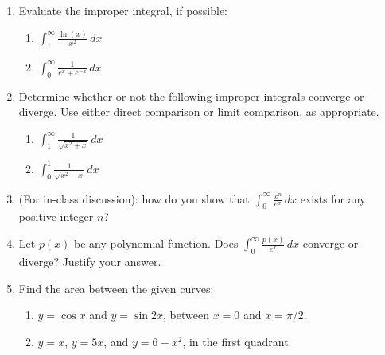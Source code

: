 \documentclass[12pt]{article}
\newcommand{\di}{\displaystyle}
\begin{document}
 \begin{enumerate}

\item Evaluate the improper integral, if possible:
\begin{multicols}{2}
\begin{enumerate}
\item $\di \int_1^\infty\frac{\ln(x)}{x^2}\,dx$



\item $\di \int_0^\infty\frac{1}{e^x+e^{-x}}\,dx$

\end{enumerate}
\end{multicols}
\vspace{3in}



\item Determine whether or not the following improper integrals converge or diverge. Use either direct comparison or limit comparison, as appropriate.
\begin{multicols}{2}
\begin{enumerate}
\item $\di \int_1^\infty \frac{1}{\sqrt{x^2+x}}\,dx$



\item $\di \int_0^1\frac{1}{\sqrt{x^2-x}}\,dx$



\end{enumerate}
\end{multicols}
\newpage


\item (For in-class discussion): how do you show that $\di\int_0^\infty \frac{x^n}{e^{x}}\,dx$ exists for any positive integer $n$?


\item Let $p(x)$ be any polynomial function. Does $\di \int_0^\infty \frac{p(x)}{e^x}\,dx$ converge or diverge? Justify your answer.

\vspace{1.75in}

\item Find the area between the given curves:
\begin{enumerate}
\item $y=\cos x$ and $y=\sin 2x$, between $x=0$ and $x=\pi/2$.

\vspace{2.5in}

  \item $y=x$, $y=5x$, and $y=6-x^2$, in the first quadrant. 
\end{enumerate}
\end{enumerate}
\end{document}

